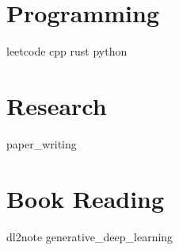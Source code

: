 \documentclass{scinote}
\begin{document}
\part{Programming}

{leetcode}
{cpp}
{rust}
{python}

\part{Research}
{paper_writing}

\part{Book Reading}
{dl2note}
{generative_deep_learning}

\begin{appendices}
	
\end{appendices}

\backmatter


\printbibliography[heading=bibintoc]
\printindex
\end{document}
